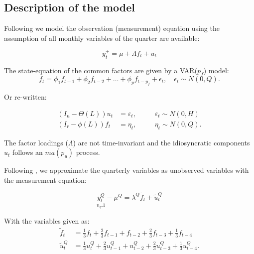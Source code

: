 \documentclass[12pt]{article}
\begin{document}
\begin{appendices}



\section{Description of the model}

Following \cite{AntolinDiazDrechselPetrella2016} we model the observation (measurement) equation using the assumption of all monthly variables of the quarter are available:

\begin{equation}
y_{t}^{+} = \mu + \Lambda f_{t} + u_{t}
\end{equation}

The state-equation of the common factors are given by a VAR($p_{f}$) model:
\begin{equation}
f_{t} = \phi_{1} f_{t-1} +\phi_{2} f_{t-2} +  \dots + \phi_{p} f_{t-p_{f}}  + \epsilon_{t}, \quad \epsilon_{t}\sim N(0, Q).
\end{equation}

Or re-written:

\begin{equation}
\begin{aligned}
\left(I_{n} - \Theta(L) \right) u_{t}	&= \varepsilon_{t}, 	\quad 	&&\varepsilon_{t}\sim N(0,H)\\
\left(I_{r} - \phi(L)  \right) f_{t} 	&= \eta_{t}, 			\quad 	&&\eta_{t}\sim N(0,Q).
\end{aligned}
\end{equation}

The factor loadings ($\Lambda$) are not time-invariant and the idiosyncratic components $u_{t}$ follows an $ma(p_{u})$ process. 

Following \cite{MarianoMurasawa2003}, we approximate the quarterly variables as unobserved variables with the measurement equation:

\begin{equation}
\underset{n_{q}.1}{y_{t}^{Q}} - \mu^{Q} = \lambda^{Q} \widetilde{f}_{t} + \widetilde{u}_{t}^{Q}
\end{equation}

With the variables given as:
\begin{equation*}
\begin{aligned}
\widetilde{f}_{t} &= \frac{1}{3} f_{t} + \frac{2}{3} f_{t-1} + f_{t-2} + \frac{2}{3} f_{t-3} + \frac{1}{3} f_{t-4}\\
\widetilde{u}_{t}^{Q} &= \frac{1}{3} u_{t}^{Q} + \frac{2}{3} u_{t-1}^{Q} + u_{t-2}^{Q} + \frac{2}{3} u_{t-3}^{Q} + \frac{1}{3} u_{t-4}^{Q}.
\end{aligned}
\end{equation*}


\end{appendices}
\end{document}
